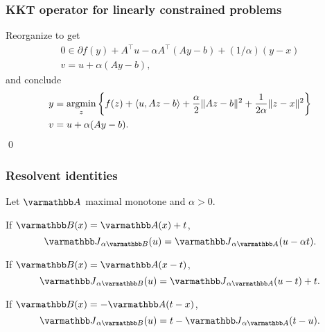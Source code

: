 \documentclass[10pt,mathserif]{beamer}
\begin{document}
\begin{frame}
\frametitle{KKT operator for linearly constrained problems}
Reorganize to get
\begin{gather*}
0\in
  \partial f(y)
+  A^\intercal u
-\alpha A^\intercal(Ay-b)
+
(1/\alpha)(y-x)\\
v = u +\alpha (Ay-b),
\end{gather*}
and conclude
\begin{align*}
y &= \operatorname*{argmin}_z \left\{
f(z)+\langle u,Az-b\rangle+\frac{\alpha}{2}\|Az-b\|^2+ \frac{1}{2\alpha}\|z-x\|^2 \right\}\\
v &= u + \alpha(Ay-b).
\end{align*}
\qed
\end{frame}



\begin{frame}[label=res_identities]
\frametitle{Resolvent identities}
Let $\opA$ maximal monotone and $\alpha>0$.

\vspace{0.2in}
If $\opB(x)=\opA(x)+t$,
\[
\opJ_{\alpha \opB}(u)=\opJ_{\alpha \opA}(u-\alpha t).
\]

\vspace{0.2in}

If $\opB(x)=\opA(x-t)$,
\[
\opJ_{\alpha \opB}(u)=\opJ_{\alpha \opA}(u-t)+t.
\]

\vspace{0.2in}
If $\opB(x)=-\opA(t-x)$,
\[
\opJ_{\alpha \opB}(u)=t-\opJ_{\alpha \opA}(t-u).
\]
\end{frame}
\end{document}
